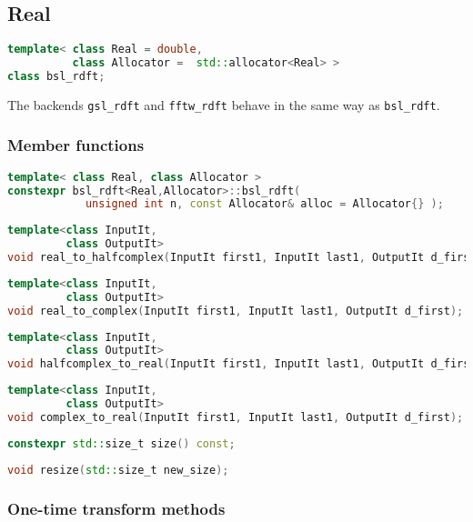\subsection{Real \dft}

\begin{lstlisting}[language=C++]
template< class Real = double, 
          class Allocator =  std::allocator<Real> >
class bsl_rdft;
\end{lstlisting}

The backends \verb|gsl_rdft| and \verb|fftw_rdft| behave in the same way as
\verb|bsl_rdft|.

\subsubsection{Member functions}

\begin{lstlisting}[language=C++]
template< class Real, class Allocator >
constexpr bsl_rdft<Real,Allocator>::bsl_rdft(
            unsigned int n, const Allocator& alloc = Allocator{} );
\end{lstlisting}
\begin{lstlisting}[language=C++]
template<class InputIt,
         class OutputIt>
void real_to_halfcomplex(InputIt first1, InputIt last1, OutputIt d_first);
\end{lstlisting}
\begin{lstlisting}[language=C++]
template<class InputIt,
         class OutputIt>
void real_to_complex(InputIt first1, InputIt last1, OutputIt d_first);
\end{lstlisting}
\begin{lstlisting}[language=C++]
template<class InputIt,
         class OutputIt>
void halfcomplex_to_real(InputIt first1, InputIt last1, OutputIt d_first);
\end{lstlisting}
\begin{lstlisting}[language=C++]
template<class InputIt,
         class OutputIt>
void complex_to_real(InputIt first1, InputIt last1, OutputIt d_first);
\end{lstlisting}
\begin{lstlisting}[language=C++]
constexpr std::size_t size() const;
\end{lstlisting}
\begin{lstlisting}[language=C++]
void resize(std::size_t new_size);
\end{lstlisting}

\subsubsection{One-time transform methods}

